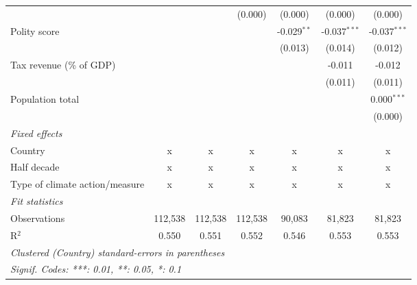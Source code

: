 \begin{tabular}{lcccccc}
                                                                                &         &                & (0.000)        & (0.000)        & (0.000)        & (0.000)\\   
   Polity score                                                                 &         &                &                & -0.029$^{**}$  & -0.037$^{***}$ & -0.037$^{***}$\\   
                                                                                &         &                &                & (0.013)        & (0.014)        & (0.012)\\   
   Tax revenue (\% of GDP)                                                      &         &                &                &                & -0.011         & -0.012\\   
                                                                                &         &                &                &                & (0.011)        & (0.011)\\   
   Population total                                                             &         &                &                &                &                & 0.000$^{***}$\\   
                                                                                &         &                &                &                &                & (0.000)\\   
   \emph{Fixed effects}\\
   Country                                                                      & x       & x              & x              & x              & x              & x\\  
   Half decade                                                                  & x       & x              & x              & x              & x              & x\\  
   Type of climate action/measure                                               & x       & x              & x              & x              & x              & x\\  
   \midrule \emph{Fit statistics}\\
   Observations                                                                 & 112,538 & 112,538        & 112,538        & 90,083         & 81,823         & 81,823\\  
   R$^2$                                                                        & 0.550   & 0.551          & 0.552          & 0.546          & 0.553          & 0.553\\  
   \midrule
   \multicolumn{7}{l}{\emph{Clustered (Country) standard-errors in parentheses}}\\
   \multicolumn{7}{l}{\emph{Signif. Codes: ***: 0.01, **: 0.05, *: 0.1}}\\
\end{tabular}
\par\endgroup


